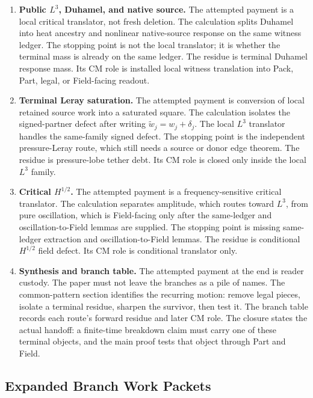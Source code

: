 \begin{enumerate}[leftmargin=*,label=\arabic*.]
\item \textbf{Public \(L^3\), Duhamel, and native source.}
The attempted payment is a local critical translator, not fresh deletion.
The calculation splits Duhamel into heat ancestry and nonlinear native-source
response on the same witness ledger.
The stopping point is not the local translator; it is whether the terminal
mass is already on the same ledger.
The residue is terminal Duhamel response mass.
Its CM role is installed local witness translation into Pack, Part, legal, or
Field-facing readout.

\item \textbf{Terminal Leray saturation.}
The attempted payment is conversion of local retained source work into a
saturated square.
The calculation isolates the signed-partner defect after writing
\(\widetilde w_j=w_j+\delta_j\).
The local \(L^3\) translator handles the same-family signed defect.
The stopping point is the independent pressure-Leray route, which still needs
a source or donor edge theorem.
The residue is pressure-lobe tether debt.
Its CM role is closed only inside the local \(L^3\) family.

\item \textbf{Critical \(H^{1/2}\).}
The attempted payment is a frequency-sensitive critical translator.
The calculation separates amplitude, which routes toward \(L^3\), from pure
oscillation, which is Field-facing only after the same-ledger and
oscillation-to-Field lemmas are supplied.
The stopping point is missing same-ledger extraction and oscillation-to-Field
lemmas.
The residue is conditional \(H^{1/2}\) field defect.
Its CM role is conditional translator only.

\item \textbf{Synthesis and branch table.}
The attempted payment at the end is reader custody.
The paper must not leave the branches as a pile of names.
The common-pattern section identifies the recurring motion: remove legal
pieces, isolate a terminal residue, sharpen the survivor, then test it.
The branch table records each route's forward residue and later CM role.
The closure states the actual handoff: a finite-time breakdown claim must
carry one of these terminal objects, and the main proof tests that object
through Part and Field.
\end{enumerate}

\subsection{Expanded Branch Work Packets}

